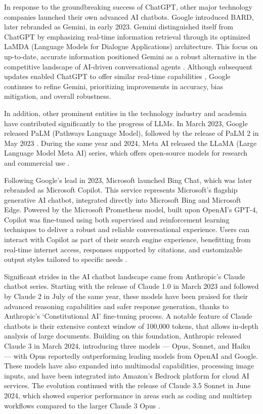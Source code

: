 In response to the groundbreaking success of ChatGPT, other major technology companies launched their own advanced AI chatbots. Google introduced BARD, later rebranded as Gemini, in early 2023. Gemini distinguished itself from ChatGPT by emphasizing real-time information retrieval through its optimized LaMDA (Language Models for Dialogue Applications) architecture. This focus on up-to-date, accurate information positioned Gemini as a robust alternative in the competitive landscape of AI-driven conversational agents \cite{team2023gemini}. Although subsequent updates enabled ChatGPT to offer similar real-time capabilities \cite{aljazeera2023chatgpt}, Google continues to refine Gemini, prioritizing improvements in accuracy, bias mitigation, and overall robustness.

In addition, other prominent entities in the technology industry and academia have contributed significantly to the progress of LLMs. In March 2023, Google released PaLM (Pathways Language Model), followed by the release of PaLM 2 in May 2023 \cite{chowdhery2023palm}. During the same year and 2024, Meta AI released the LLaMA (Large Language Model Meta AI) series, which offers open-source models for research and commercial use \cite{touvron2023llama}.

Following Google’s lead in 2023, Microsoft launched Bing Chat, which was later rebranded as Microsoft Copilot. This service represents Microsoft’s flagship generative AI chatbot, integrated directly into Microsoft Bing and Microsoft Edge. Powered by the Microsoft Prometheus model, built upon OpenAI’s GPT-4, Copilot was fine-tuned using both supervised and reinforcement learning techniques to deliver a robust and reliable conversational experience. Users can interact with Copilot as part of their search engine experience, benefitting from real-time internet access, responses supported by citations, and customizable output styles tailored to specific needs \cite{microsoft2024copilot, wikipedia2023copilot}.

Significant strides in the AI chatbot landscape came from Anthropic’s Claude chatbot series. Starting with the release of Claude 1.0 in March 2023 and followed by Claude 2 in July of the same year, these models have been praised for their advanced reasoning capabilities and safer response generation, thanks to Anthropic’s ‘Constitutional AI’ fine-tuning process. A notable feature of Claude chatbots is their extensive context window of 100,000 tokens, that allows in-depth analysis of large documents. Building on this foundation, Anthropic released Claude 3 in March 2024, introducing three models — Opus, Sonnet, and Haiku — with Opus reportedly outperforming leading models from OpenAI and Google. These models have also expanded into multimodal capabilities, processing image inputs, and have been integrated into Amazon’s Bedrock platform for cloud AI services. The evolution continued with the release of Claude 3.5 Sonnet in June 2024, which showed superior performance in areas such as coding and multistep workflows compared to the larger Claude 3 Opus \cite{wikipedia2024anthropic, anthropic2024claude}.


